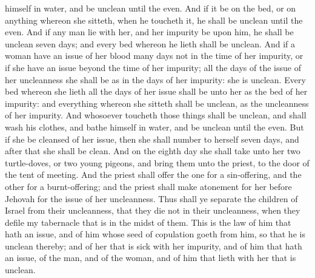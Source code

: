 himself in water, and be unclean until the even. And if it be on the bed, or on anything whereon she sitteth, when he toucheth it, he shall be unclean until the even. And if any man lie with her, and her impurity be upon him, he shall be unclean seven days; and every bed whereon he lieth shall be unclean.  And if a woman have an issue of her blood many days not in the time of her impurity, or if she have an issue beyond the time of her impurity; all the days of the issue of her uncleanness she shall be as in the days of her impurity: she is unclean. Every bed whereon she lieth all the days of her issue shall be unto her as the bed of her impurity: and everything whereon she sitteth shall be unclean, as the uncleanness of her impurity. And whosoever toucheth those things shall be unclean, and shall wash his clothes, and bathe himself in water, and be unclean until the even. But if she be cleansed of her issue, then she shall number to herself seven days, and after that she shall be clean. And on the eighth day she shall take unto her two turtle-doves, or two young pigeons, and bring them unto the priest, to the door of the tent of meeting. And the priest shall offer the one for a sin-offering, and the other for a burnt-offering; and the priest shall make atonement for her before Jehovah for the issue of her uncleanness.  Thus shall ye separate the children of Israel from their uncleanness, that they die not in their uncleanness, when they defile my tabernacle that is in the midst of them.  This is the law of him that hath an issue, and of him whose seed of copulation goeth from him, so that he is unclean thereby; and of her that is sick with her impurity, and of him that hath an issue, of the man, and of the woman, and of him that lieth with her that is unclean. 

